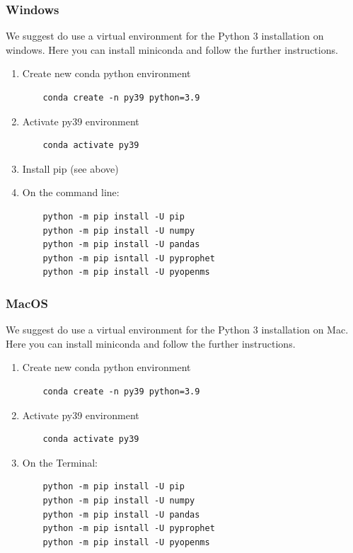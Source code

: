 \subsubsection{Windows}
We suggest do use a virtual environment for the Python 3 installation on windows. 
Here you can install miniconda and follow the further instructions. \\

\begin{enumerate}
  \item Create new conda python environment
    \begin{lstlisting}
    conda create -n py39 python=3.9
    \end{lstlisting} 
  \item Activate py39 environment
    \begin{lstlisting}
    conda activate py39
    \end{lstlisting} 
  \item Install pip (see above)
  \item On the command line:
    \begin{listing}
\begin{verbatim}
    python -m pip install -U pip
    python -m pip install -U numpy
    python -m pip install -U pandas
    python -m pip isntall -U pyprophet
    python -m pip install -U pyopenms
    \end{verbatim}
\end{listing}
\end{enumerate}

\subsubsection{MacOS}
We suggest do use a virtual environment for the Python 3 installation on Mac. 
Here you can install miniconda and follow the further instructions. \\

\begin{enumerate}
  \item Create new conda python environment
    \begin{lstlisting}
    conda create -n py39 python=3.9
    \end{lstlisting} 
    \item Activate py39 environment
    \begin{lstlisting}
    conda activate py39
    \end{lstlisting} 
  \item On the Terminal:
    \begin{listing}
\begin{verbatim}
    python -m pip install -U pip
    python -m pip install -U numpy
    python -m pip install -U pandas
    python -m pip isntall -U pyprophet
    python -m pip install -U pyopenms
    \end{verbatim}
\end{listing}
\end{enumerate}

